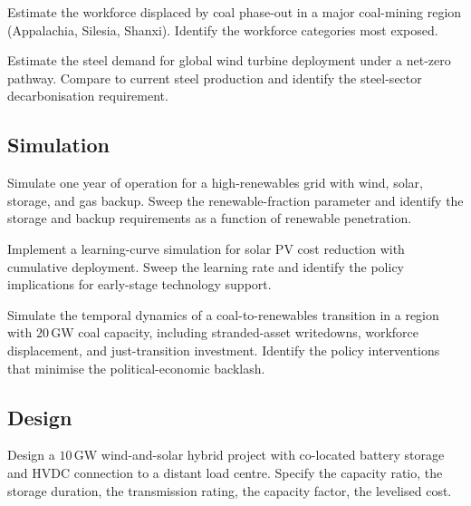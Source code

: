 \begin{exercise}
Estimate the workforce displaced by coal phase-out in a major coal-mining region (Appalachia, Silesia, Shanxi). Identify the workforce categories most exposed.
\end{exercise}

\begin{exercise}
Estimate the steel demand for global wind turbine deployment under a net-zero pathway. Compare to current steel production and identify the steel-sector decarbonisation requirement.
\end{exercise}

\subsection*{Simulation}

\begin{exercise}
Simulate one year of operation for a high-renewables grid with wind, solar, storage, and gas backup. Sweep the renewable-fraction parameter and identify the storage and backup requirements as a function of renewable penetration.
\end{exercise}

\begin{exercise}
Implement a learning-curve simulation for solar PV cost reduction with cumulative deployment. Sweep the learning rate and identify the policy implications for early-stage technology support.
\end{exercise}

\begin{exercise}
Simulate the temporal dynamics of a coal-to-renewables transition in a region with $20\,\text{GW}$ coal capacity, including stranded-asset writedowns, workforce displacement, and just-transition investment. Identify the policy interventions that minimise the political-economic backlash.
\end{exercise}

\subsection*{Design}

\begin{exercise}
Design a $10\,\text{GW}$ wind-and-solar hybrid project with co-located battery storage and HVDC connection to a distant load centre. Specify the capacity ratio, the storage duration, the transmission rating, the capacity factor, the levelised cost.
\end{exercise}

